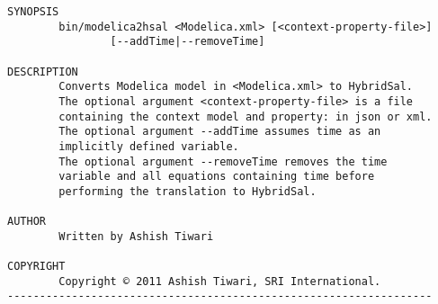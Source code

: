 \documentclass{llncs}
\begin{document}
\begin{tt}
\begin{verbatim}
SYNOPSIS
        bin/modelica2hsal <Modelica.xml> [<context-property-file>]
                [--addTime|--removeTime]

DESCRIPTION
        Converts Modelica model in <Modelica.xml> to HybridSal. 
        The optional argument <context-property-file> is a file 
        containing the context model and property: in json or xml.
        The optional argument --addTime assumes time as an 
        implicitly defined variable.
        The optional argument --removeTime removes the time 
        variable and all equations containing time before 
        performing the translation to HybridSal.

AUTHOR
        Written by Ashish Tiwari

COPYRIGHT
        Copyright © 2011 Ashish Tiwari, SRI International.
------------------------------------------------------------------
\end{verbatim}
\end{tt}
\end{document}
